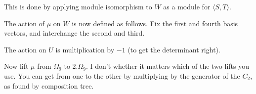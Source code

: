 This is done by applying module isomorphism to $W$ as a module for $\langle S, T\rangle$.

The action of $\mu$ on $W$ is now defined as follows.  Fix the first and fourth basis vectors, and
interchange the second and third.

The action on $U$ is multiplication by $-1$ (to get the determinant right).

Now lift $\mu$ from $\Omega_9$ to $2.\Omega_9$.  I don't whether it matters which of the two lifts
you use.  You can get from one to the other by multiplying by the generator of the $C_2$, as
found by composition tree.

\bye